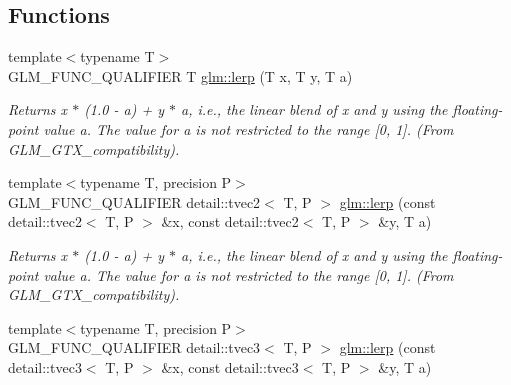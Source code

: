 \subsection*{Functions}
\begin{CompactItemize}
\item 
\hypertarget{group__gtx__compatibility_gaa6c29517f08a1b486b87e5da419af32}{
{\footnotesize template$<$typename T$>$ }\\GLM\_\-FUNC\_\-QUALIFIER T \hyperlink{group__gtx__compatibility_gaa6c29517f08a1b486b87e5da419af32}{glm::lerp} (T x, T y, T a)}
\label{group__gtx__compatibility_gaa6c29517f08a1b486b87e5da419af32}

\begin{CompactList}\small\item\em Returns x $\ast$ (1.0 - a) + y $\ast$ a, i.e., the linear blend of x and y using the floating-point value a. The value for a is not restricted to the range \mbox{[}0, 1\mbox{]}. (From GLM\_\-GTX\_\-compatibility). \item\end{CompactList}\item 
\hypertarget{group__gtx__compatibility_gce46313a3fdfc63383d8eba84a17251a}{
{\footnotesize template$<$typename T, precision P$>$ }\\GLM\_\-FUNC\_\-QUALIFIER detail::tvec2$<$ T, P $>$ \hyperlink{group__gtx__compatibility_gce46313a3fdfc63383d8eba84a17251a}{glm::lerp} (const detail::tvec2$<$ T, P $>$ \&x, const detail::tvec2$<$ T, P $>$ \&y, T a)}
\label{group__gtx__compatibility_gce46313a3fdfc63383d8eba84a17251a}

\begin{CompactList}\small\item\em Returns x $\ast$ (1.0 - a) + y $\ast$ a, i.e., the linear blend of x and y using the floating-point value a. The value for a is not restricted to the range \mbox{[}0, 1\mbox{]}. (From GLM\_\-GTX\_\-compatibility). \item\end{CompactList}\item 
\hypertarget{group__gtx__compatibility_g1dd9bee5e30a2a9afc7e5892f95e5023}{
{\footnotesize template$<$typename T, precision P$>$ }\\GLM\_\-FUNC\_\-QUALIFIER detail::tvec3$<$ T, P $>$ \hyperlink{group__gtx__compatibility_g1dd9bee5e30a2a9afc7e5892f95e5023}{glm::lerp} (const detail::tvec3$<$ T, P $>$ \&x, const detail::tvec3$<$ T, P $>$ \&y, T a)}
\label{group__gtx__compatibility_g1dd9bee5e30a2a9afc7e5892f95e5023}


\end{CompactItemize}
